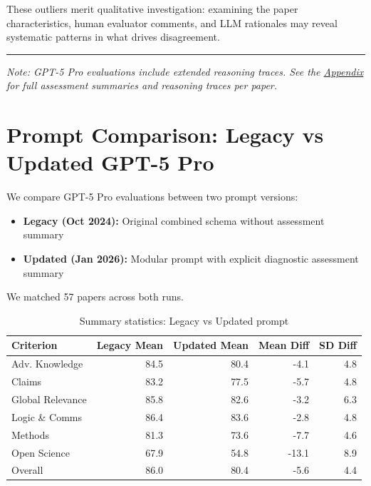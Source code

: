 \documentclass[
  11pt,
  letterpaper,
  DIV=11,
  numbers=noendperiod]{scrreprt}
\providecommand{\tightlist}{%
  \setlength{\itemsep}{0pt}\setlength{\parskip}{0pt}}
\begin{document}
These outliers merit qualitative investigation: examining the paper
characteristics, human evaluator comments, and LLM rationales may reveal
systematic patterns in what drives disagreement.

\begin{center}\rule{0.5\linewidth}{0.5pt}\end{center}

\emph{Note: GPT-5 Pro evaluations include extended reasoning traces. See
the \href{appendix_llm_traces.qmd}{Appendix} for full assessment
summaries and reasoning traces per paper.}

\section{Prompt Comparison: Legacy vs Updated GPT-5
Pro}\label{prompt-comparison-legacy-vs-updated-gpt-5-pro}

We compare GPT-5 Pro evaluations between two prompt versions:

\begin{itemize}
\tightlist
\item
  \textbf{Legacy (Oct 2024):} Original combined schema without
  assessment summary
\item
  \textbf{Updated (Jan 2026):} Modular prompt with explicit diagnostic
  assessment summary
\end{itemize}

We matched 57 papers across both runs.

\begin{longtable}[t]{lrrrr}

\caption{\label{tbl-prompt-summary}Summary statistics: Legacy vs Updated
prompt}

\tabularnewline

\toprule
Criterion & Legacy Mean & Updated Mean & Mean Diff & SD Diff\\
\midrule
Adv. Knowledge & 84.5 & 80.4 & -4.1 & 4.8\\
Claims & 83.2 & 77.5 & -5.7 & 4.8\\
Global Relevance & 85.8 & 82.6 & -3.2 & 6.3\\
Logic \& Comms & 86.4 & 83.6 & -2.8 & 4.8\\
Methods & 81.3 & 73.6 & -7.7 & 4.6\\
\addlinespace
Open Science & 67.9 & 54.8 & -13.1 & 8.9\\
Overall & 86.0 & 80.4 & -5.6 & 4.4\\
\bottomrule

\end{longtable}
\end{document}
